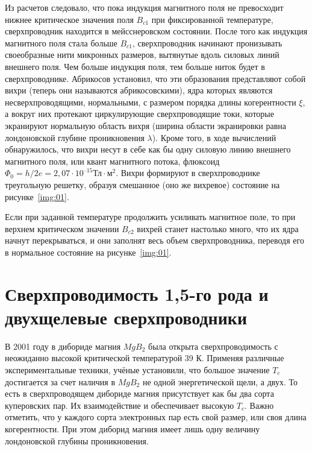 Из расчетов следовало, что пока индукция магнитного поля не превосходит нижнее 
критическое значения поля \( B_{c1} \) при фиксированной температуре, 
сверхпроводник находится в мейсснеровском состоянии. После того как индукция 
магнитного поля стала больше \( B_{c1} \), сверхпроводник начинают пронизывать 
своеобразные нити микронных размеров, вытянутые вдоль силовых линий внешнего 
поля. Чем больше индукция поля, тем больше ниток будет в сверхпроводнике. 
Абрикосов установил, что эти образования представляют собой вихри (теперь они 
называются абрикосовскими), ядра которых являются несверхпроводящими, 
нормальными, с размером порядка длины когерентности \( \xi \), а вокруг них 
протекают циркулирующие сверхпроводящие токи, которые экранируют нормальную 
область вихря (ширина области экранировки равна лондоновской глубине 
проникновения \( \lambda \)). Кроме того, в ходе вычислений обнаружилось, что 
вихри несут в себе как бы одну силовую линию внешнего магнитного поля, или 
квант магнитного потока, флюксоид 
\( \Phi_0 = h/2e = 2,07\cdot10^{–15} \text{Тл}\cdot{м}^2 \). Вихри формируют в 
сверхпроводнике треугольную решетку, образуя смешанное (оно же вихревое) 
состояние на рисунке~\ref{img:01}.

Если при заданной температуре продолжить усиливать магнитное поле, то при 
верхнем критическом значении \( B_{c2} \) вихрей станет настолько много, что 
их ядра начнут перекрываться, и они заполнят весь объем сверхпроводника, 
переводя его в нормальное состояние на рисунке~\ref{img:01}. \cite{bib:net}

\section{Сверхпроводимость 1,5-го рода и двухщелевые сверхпроводники}
В 2001 году в дибориде магния \( MgB_2 \) была открыта сверхпроводимость с 
неожиданно высокой критической температурой 39 К. Применяя различные 
экспериментальные техники, учёные установили, что большое значение \( T_c \) 
достигается за счет наличия в \( MgB_2 \) не одной энергетической щели, а 
двух. То есть в сверхпроводящем дибориде магния присутствует как бы два сорта 
куперовских пар. Их взаимодействие и обеспечивает высокую \( T_c \). Важно 
отметить, что у каждого сорта электронных пар есть свой размер, или своя длина 
когерентности. При этом диборид магния имеет лишь одну величину лондоновской 
глубины проникновения.


